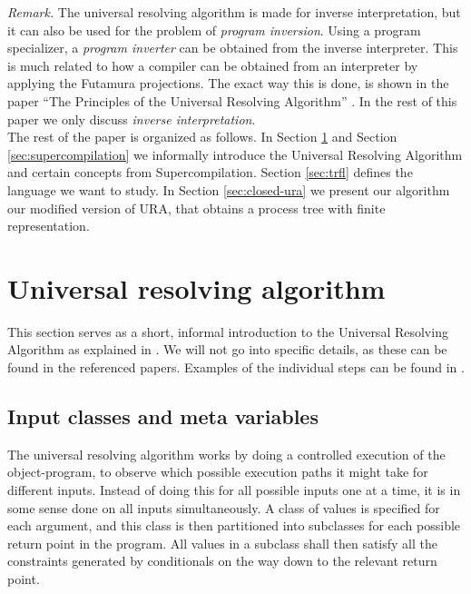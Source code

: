 \documentclass[10pt]{../sigplanconf}
\begin{document}
\textit{Remark.} The universal resolving algorithm is made for inverse
interpretation, but it can also be used for the problem of
\textit{program inversion}. Using a program specializer, a
\textit{program inverter} can be obtained from the inverse
interpreter. This is much related to how a compiler can be obtained
from an interpreter by applying the Futamura projections. The exact
way this is done, is shown in the paper ``The Principles of the
Universal Resolving Algorithm'' \cite{abramov2000universal}. In the
rest of this paper we only discuss \textit{inverse interpretation}.\\

The rest of the paper is organized as follows. In Section
\ref{sec:ura} and Section \ref{sec:supercompilation} we informally
introduce the Universal Resolving Algorithm and certain concepts from
Supercompilation. Section \ref{sec:trfl} defines the language we
want to study. In Section \ref{sec:closed-ura} we present our
algorithm our modified version of URA, that obtains a process tree
with finite representation.


\section{Universal resolving algorithm}
\label{sec:ura}
This section serves as a short, informal introduction to the Universal
Resolving Algorithm as explained in \cite{abramov2000universal,
  abramov2002universal, abramov2002principles}. We will not go into
specific details, as these can be found in the referenced
papers. Examples of the individual steps can be found in
\cite{abramov2000universal}.

\subsection{Input classes and meta variables}
The universal resolving algorithm works by doing a controlled
execution of the object-program, to observe which possible execution
paths it might take for different inputs. Instead of doing this for
all possible inputs one at a time, it is in some sense done on all
inputs simultaneously. A class of values is specified for each
argument, and this class is then partitioned into subclasses for each
possible return point in the program. All values in a subclass shall
then satisfy all the constraints generated by conditionals on the way
down to the relevant return point.
\end{document}
